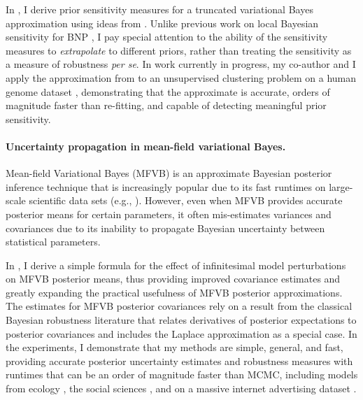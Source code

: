 In \citep{giordano:2018:bnpsensitivity}, I derive prior sensitivity measures for
a truncated variational Bayes approximation using ideas from \citep{gustafson:1996:localposterior,
giordano:2018:covariances}. Unlike previous work on local Bayesian sensitivity
for BNP \citep{Basu:2000:BNP_robustness}, I pay special attention to the
ability of the sensitivity measures to \emph{extrapolate} to different priors,
rather than treating the sensitivity as a measure of robustness \textit{per se}.
In work currently in progress, my co-author and I apply the approximation from
\citep{giordano:2018:bnpsensitivity} to an unsupervised clustering problem on a
human genome dataset \citep{huang:2011:haplotype, raj:2014:faststructure},
demonstrating that the approximate is accurate, orders of magnitude faster than
re-fitting, and capable of detecting meaningful prior sensitivity.


\paragraph{Uncertainty propagation in mean-field variational Bayes.}

Mean-field Variational Bayes (MFVB) is an approximate Bayesian posterior
inference technique that is increasingly popular due to its fast runtimes on
large-scale scientific data sets (e.g., \citet{raj:2014:faststructure,
kucukelbir:2017:advi, regier:2019:cataloging}). However, even when MFVB provides
accurate posterior means for certain parameters, it often mis-estimates
variances and covariances \citep{wang:2005:inadequacy, turner:2011:two} due to
its inability to propagate Bayesian uncertainty between statistical parameters.

In \citet{giordano:2015:linear, giordano:2018:covariances}, I derive a simple
formula for the effect of infinitesimal model perturbations on MFVB posterior
means, thus providing improved covariance estimates and greatly expanding the
practical usefulness of MFVB posterior approximations. The estimates for MFVB
posterior covariances rely on a result from the classical Bayesian robustness
literature that relates derivatives of posterior expectations to posterior
covariances and includes the Laplace approximation as a special case.
In the experiments, I demonstrate that my methods are simple, general, and
fast, providing accurate posterior uncertainty estimates and robustness measures
with runtimes that can be an order of magnitude faster than MCMC, including
models from ecology \citep{kery:2011:bayesian}, the social sciences
\citep{gelman:2006:arm}, and on a massive internet advertising dataset
\citep{criteo:2014:dataset}.



